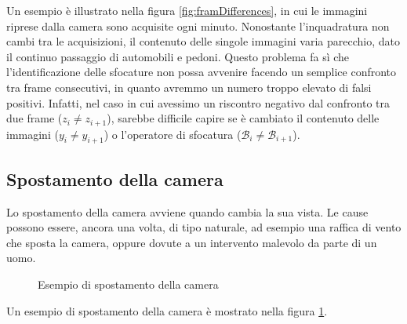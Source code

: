 \noindent Un esempio \`e illustrato nella figura \ref{fig:framDifferences}, in cui le immagini riprese dalla camera sono acquisite ogni minuto. 
Nonostante l'inquadratura non cambi tra le acquisizioni, il contenuto delle singole immagini varia parecchio, dato il continuo passaggio di automobili e pedoni.
Questo problema fa s\`i che l'identificazione delle sfocature non possa avvenire facendo un semplice confronto tra frame consecutivi, in quanto avremmo un numero troppo elevato di falsi positivi.
Infatti, nel caso in cui avessimo un riscontro negativo dal confronto tra due frame ($z_i \neq z_{i + 1}$), sarebbe difficile capire se \`e cambiato il contenuto delle immagini ($y_i \neq y_{i + 1}$) o l'operatore di sfocatura ($\mathcal{B}_i \neq \mathcal{B}_{i + 1}$). 
\subsection{Spostamento della camera}
Lo spostamento della camera avviene quando cambia la sua vista.
Le cause possono essere, ancora una volta, di tipo naturale, ad esempio una raffica di vento che sposta la camera, oppure dovute a un intervento malevolo da parte di un uomo.
\begin{figure}
	\centering
	\caption{Esempio di spostamento della camera}
	\label{fig:testiDISPLACEMENT}
\end{figure}
\noindent Un esempio di spostamento della camera \`e mostrato nella figura \ref{fig:testiDISPLACEMENT}.
